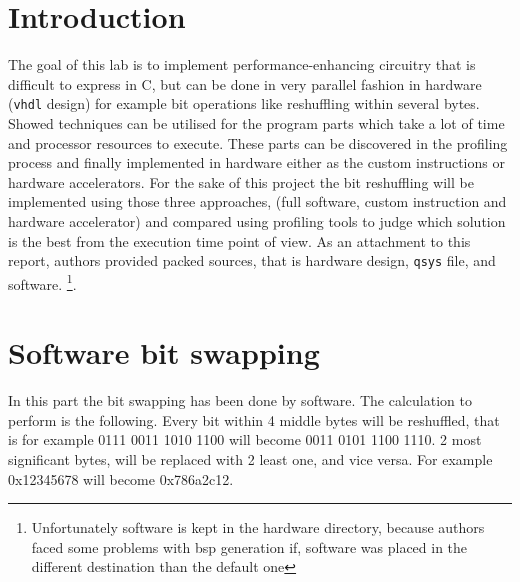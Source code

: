 \chapter{Introduction}
The goal of this lab is to implement performance-enhancing circuitry that is difficult to express in C, but can be done in very parallel fashion in hardware (\verb|vhdl| design) for example bit operations like reshuffling within several bytes. Showed techniques can be utilised for the program parts which take a lot of time and processor resources to execute. These parts can be discovered in the profiling process and finally implemented in hardware either as the custom instructions or hardware accelerators. For the sake of this project the bit reshuffling will be implemented using those three approaches, (full software, custom instruction and hardware accelerator) and compared using profiling tools to judge which solution is the best from the execution time point of view. As an attachment to this report, authors provided packed sources, that is hardware design, \verb|qsys| file, and software. \footnote{Unfortunately software is kept in the hardware directory, because authors faced some problems with bsp generation if, software was placed in the different destination than the default one}. 

\begingroup
\renewcommand{\cleardoublepage}{}
\renewcommand{\clearpage}{}
\chapter{Software bit swapping}
\endgroup
In this part the bit swapping has been done by software. The calculation to perform is the following. Every bit within 4 middle bytes will be reshuffled, that is for example 0111 0011 1010 1100 will become 0011 0101 1100 1110. 2 most significant bytes, will be replaced with 2 least one, and vice versa. For example 0x12345678 will become 0x786a2c12.
